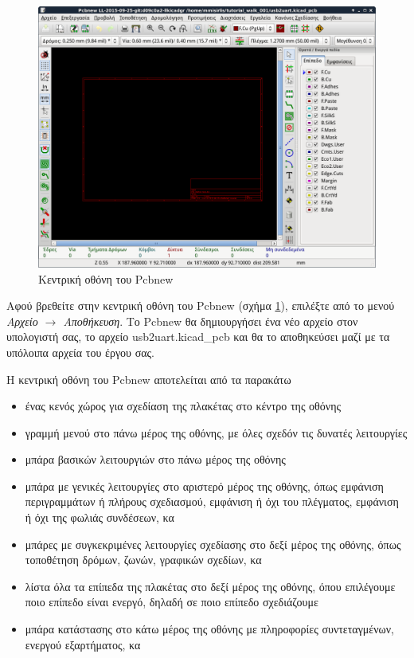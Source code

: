 \documentclass[a4paper]{article}
\begin{document}
\begin{figure}
  \begin{center}
    \includegraphics[width=.9\textwidth]{img/pcb-wind-main.png}
    \caption{Κεντρική οθόνη του Pcbnew}
    \label{fig:pcb-wind-main}
  \end{center}
\end{figure}

Αφού βρεθείτε στην κεντρική οθόνη του Pcbnew (σχήμα \ref{fig:pcb-wind-main}), επιλέξτε από το μενού \textit{Αρχείο $\rightarrow$ Αποθήκευση}. Το Pcbnew θα δημιουργήσει ένα νέο αρχείο στον υπολογιστή σας, το αρχείο usb2uart.kicad\_pcb και θα το αποθηκεύσει μαζί με τα υπόλοιπα αρχεία του έργου σας.

H κεντρική οθόνη του Pcbnew αποτελείται από τα παρακάτω
\begin{itemize}
    \item ένας κενός χώρος για σχεδίαση της πλακέτας στο κέντρο της οθόνης
    \item γραμμή μενού στο πάνω μέρος της οθόνης, με όλες σχεδόν τις δυνατές λειτουργίες
    \item μπάρα βασικών λειτουργιών στο πάνω μέρος της οθόνης
    \item μπάρα με γενικές λειτουργίες στο αριστερό μέρος της οθόνης, όπως εμφάνιση περιγραμμάτων ή πλήρους σχεδιασμού, εμφάνιση ή όχι του πλέγματος, εμφάνιση ή όχι της φωλιάς συνδέσεων, κα
    \item μπάρες με συγκεκριμένες λειτουργίες σχεδίασης στο δεξί μέρος της οθόνης, όπως τοποθέτηση δρόμων, ζωνών, γραφικών σχεδίων, κα
    \item λίστα όλα τα επίπεδα της πλακέτας στο δεξί μέρος της οθόνης, όπου επιλέγουμε ποιο επίπεδο είναι ενεργό, δηλαδή σε ποιο επίπεδο σχεδιάζουμε
    \item μπάρα κατάστασης στο κάτω μέρος της οθόνης με πληροφορίες συντεταγμένων, ενεργού εξαρτήματος, κα
\end{itemize}
\end{document}
